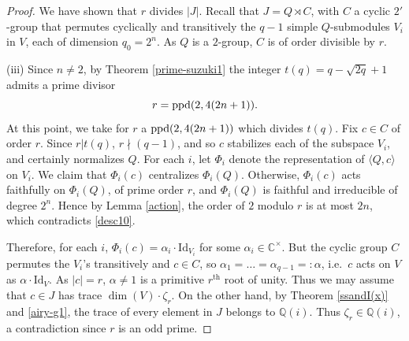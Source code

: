 \documentclass[11pt]{amsart}
\theoremstyle{plain}
\theoremstyle{definition}
\numberwithin{thm}{section}
\numberwithin{equation}{thm}
\newcommand{\sG}{{\mathcal G}}
\newcommand{\sL}{{\mathcal L}}
\newcommand{\C}{{\mathbb C}}
\newcommand{\Q}{{\mathbb Q}}
\newcommand{\0}{\emptyset}
\newcommand{\ppd}{{\rm ppd}}
\newcommand{\geo}{{\mathrm {geom}}}
\begin{document}
\begin{proof}
We have shown that $r$ divides $|J|$. Recall that $J = Q \rtimes C$, with $C$ a cyclic $2'$-group that permutes cyclically and 
transitively the $q-1$ simple $Q$-submodules $V_i$ in $V$, each of dimension $q_0=2^n$. As $Q$ is a $2$-group, $C$ is of order 
divisible by $r$. 

\smallskip
(iii) Since $n \neq 2$, by Theorem \ref{prime-suzuki1} the integer $t(q)=q-\sqrt{2q}+1$ admits a prime divisor 
\begin{equation}\label{desc10}
  r = \ppd(2,4(2n+1)).
\end{equation}  
At this point, we take for $r$ a $\ppd(2,4(2n+1))$ which divides $t(q)$.
Fix 
$c \in C$ of order $r$. Since $r|t(q)$, $r \nmid (q-1)$, and so $c$ stabilizes each of the subspace 
$V_i$, and certainly normalizes $Q$. For each $i$, let $\Phi_i$ denote the representation of $\langle Q,c \rangle$ on $V_i$. 
We claim that $\Phi_i(c)$ centralizes $\Phi_i(Q)$. 
Otherwise, $\Phi_i(c)$ acts faithfully on $\Phi_i(Q)$, of prime order $r$, and $\Phi_i(Q)$ is faithful and irreducible of degree 
$2^n$. Hence by Lemma \ref{action}, the order of $2$ modulo $r$ is at most $2n$, which contradicts \eqref{desc10}.

Therefore, for each $i$, $\Phi_i(c) = \alpha_i \cdot {\mathrm {Id}}_{V_i}$ for some $\alpha_i \in \C^\times$. But the cyclic group $C$ permutes the $V_i$'s transitively and $c \in C$, so $\alpha_1 = \ldots = \alpha_{q-1} =: \alpha$, i.e.\ $c$ acts on $V$ 
as $\alpha \cdot \mathrm{Id}_V$. As $|c|=r$, $\alpha \neq 1$ is a primitive $r^{\mathrm {th}}$ root of unity. Thus we may assume 
that 
$c \in J$ has trace $\dim(V) \cdot \zeta_r$. On the other hand, by Theorem \ref{ssandI(x)} and \eqref{airy-g1}, the trace of every element in $J$ belongs to
$\Q(i)$. Thus $\zeta_r \in \Q(i)$, a contradiction since $r$ is an odd prime. 


\end{proof}
\end{document}
